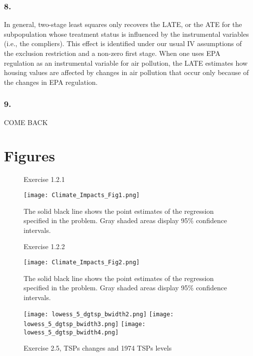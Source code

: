\documentclass[12pt]{article}
\begin{document}
\subsubsection*{8.}
In general, two-stage least squares only recovers the LATE, or the ATE for the subpopulation whose treatment status is influenced by the instrumental variables (i.e., the compliers). This effect is identified under our usual IV assumptions of the exclusion restriction and a non-zero first stage. When one uses EPA regulation as an instrumental variable for air pollution, the LATE estimates how housing values are affected by changes in air pollution that occur only because of the changes in EPA regulation. %




\subsubsection*{9.}
COME BACK

\clearpage


\section*{Figures}

\begin{figure}[h!]
\centering
\caption{Exercise 1.2.1}
\texttt{[image: Climate\_Impacts\_Fig1.png]}
\caption*{The solid black line shows the point estimates of the regression specified in the problem. Gray shaded areas display 95\% confidence intervals.}
\label{fig_climate_impacts_1}
\end{figure}


\begin{figure}[h!]
\centering
\caption{Exercise 1.2.2}
\texttt{[image: Climate\_Impacts\_Fig2.png]}
\caption*{The solid black line shows the point estimates of the regression specified in the problem. Gray shaded areas display 95\% confidence intervals.}
\label{fig_climate_impacts_2}
\end{figure}

\clearpage

\begin{figure}[h!]
\centering
\caption{Exercise 2.5, TSPs changes and 1974 TSPs levels}
\texttt{[image: lowess\_5\_dgtsp\_bwidth2.png]}
\texttt{[image: lowess\_5\_dgtsp\_bwidth3.png]}
\texttt{[image: lowess\_5\_dgtsp\_bwidth4.png]}
\label{fig_lowess5_house}
\end{figure}
\end{document}
